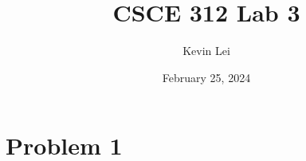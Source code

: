 \documentclass{article}
\title{CSCE 312 Lab 3}
\author{Kevin Lei}
\date{February 25, 2024}
\begin{document}
\maketitle

\section{Problem 1}
\end{document}
